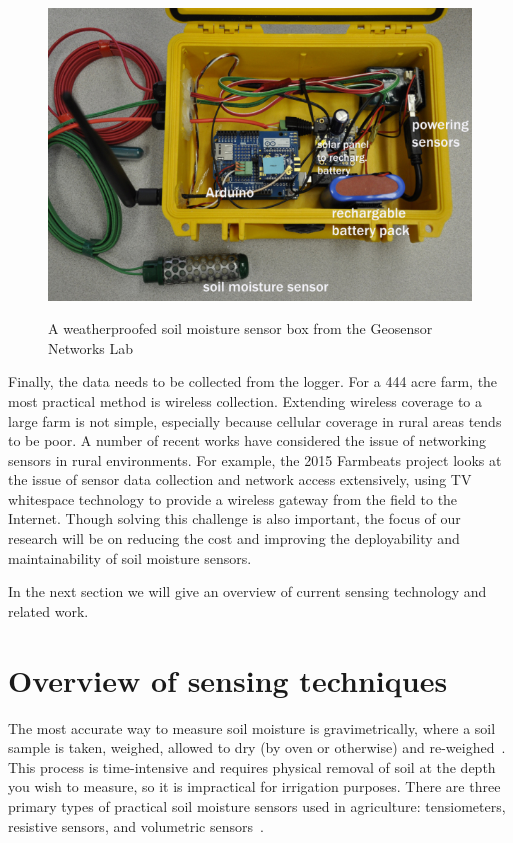 \documentclass[12pt]{article}
\begin{document}
\begin{figure}[h!]
  \centering
  \includegraphics[scale=0.75]{soil_moisture_sn_setup.jpg}\\
  \caption{A weatherproofed soil moisture sensor box from the
    Geosensor Networks Lab~\cite{sensorbox}}
\end{figure}

Finally, the data needs to be collected from the logger. For a 444
acre farm, the most practical method is wireless collection. Extending
wireless coverage to a large farm is not simple, especially because
cellular coverage in rural areas tends to be poor. A number of recent
works have considered the issue of networking sensors in rural
environments. For example, the 2015 Farmbeats project looks at the
issue of sensor data collection and network access extensively, using
TV whitespace technology to provide a wireless gateway from the field
to the Internet. Though solving this challenge is also important, the
focus of our research will be on reducing the cost and improving the
deployability and maintainability of soil moisture sensors.

In the next section we will give an overview of current sensing
technology and related work.

\section*{Overview of sensing techniques}

The most accurate way to measure soil moisture is gravimetrically,
where a soil sample is taken, weighed, allowed to dry (by oven or
otherwise) and re-weighed~\cite{Noborio2001}. This process is
time-intensive and requires physical removal of soil at the depth you
wish to measure, so it is impractical for irrigation purposes. There
are three primary types of practical soil moisture sensors used in
agriculture: tensiometers, resistive sensors, and volumetric
sensors~\cite{sensorTypes}.
\end{document}

